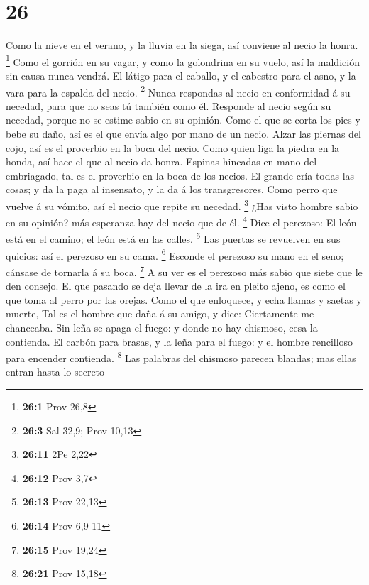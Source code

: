 \hypertarget{section-25}{%
\section{26}\label{section-25}}

 Como la nieve en el verano, y la lluvia en la siega, así
conviene al necio la honra. \footnote{\textbf{26:1} Prov 26,8}
 Como el gorrión en su vagar, y como la golondrina en su
vuelo, así la maldición sin causa nunca vendrá.  El látigo
para el caballo, y el cabestro para el asno, y la vara para la espalda
del necio. \footnote{\textbf{26:3} Sal 32,9; Prov 10,13} 
Nunca respondas al necio en conformidad á su necedad, para que no seas
tú también como él.  Responde al necio según su necedad,
porque no se estime sabio en su opinión.  Como el que se
corta los pies y bebe su daño, así es el que envía algo por mano de un
necio.  Alzar las piernas del cojo, así es el proverbio en
la boca del necio.  Como quien liga la piedra en la honda,
así hace el que al necio da honra.  Espinas hincadas en
mano del embriagado, tal es el proverbio en la boca de los necios.
 El grande cría todas las cosas; y da la paga al
insensato, y la da á los transgresores.  Como perro que
vuelve á su vómito, así el necio que repite su necedad. \footnote{\textbf{26:11}
  2Pe 2,22}  ¿Has visto hombre sabio en su opinión? más
esperanza hay del necio que de él. \footnote{\textbf{26:12} Prov 3,7}
 Dice el perezoso: El león está en el camino; el león
está en las calles. \footnote{\textbf{26:13} Prov 22,13} 
Las puertas se revuelven en sus quicios: así el perezoso en su cama.
\footnote{\textbf{26:14} Prov 6,9-11}  Esconde el
perezoso su mano en el seno; cánsase de tornarla á su boca. \footnote{\textbf{26:15}
  Prov 19,24}  A su ver es el perezoso más sabio que
siete que le den consejo.  El que pasando se deja llevar
de la ira en pleito ajeno, es como el que toma al perro por las orejas.
 Como el que enloquece, y echa llamas y saetas y muerte,
 Tal es el hombre que daña á su amigo, y dice:
Ciertamente me chanceaba.  Sin leña se apaga el fuego: y
donde no hay chismoso, cesa la contienda.  El carbón para
brasas, y la leña para el fuego: y el hombre rencilloso para encender
contienda. \footnote{\textbf{26:21} Prov 15,18}  Las
palabras del chismoso parecen blandas; mas ellas entran hasta lo secreto
